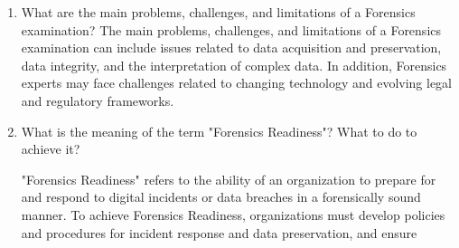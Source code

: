 \documentclass{scrreprt}
\begin{document}
\begin{enumerate}
\item What are the main problems, challenges, and limitations of a Forensics examination? 
The main problems, challenges, and limitations of a Forensics examination can include issues related to data acquisition and preservation, data integrity, and the interpretation of complex data. In addition, Forensics experts may face challenges related to changing technology and evolving legal and regulatory frameworks.
\item What is the meaning of the term "Forensics Readiness"? What to do to achieve it? 

"Forensics Readiness" refers to the ability of an organization to prepare for and respond to digital incidents or data breaches in a forensically sound manner. To achieve Forensics Readiness, organizations must develop policies and procedures for incident response and data preservation, and ensure
\end{enumerate}
\end{document}
